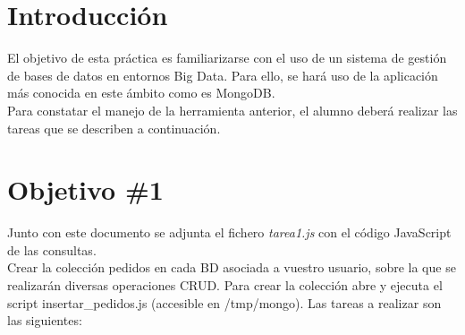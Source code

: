 \usepackage[table,xcdraw]{xcolor}


\newpage         




	
\setcounter{page}{0}



\thispagestyle{empty}

\newpage %

\tableofcontents %


\newpage


\section{Introducción}

El objetivo de esta práctica es familiarizarse con el uso de un sistema de gestión de bases de datos en entornos Big Data. Para ello, se hará uso de la aplicación más conocida en este ámbito como es MongoDB. \\

Para constatar el manejo de la herramienta anterior, el alumno deberá realizar las tareas que se describen a continuación. \\

\section{Objetivo \#1}

Junto con este documento se adjunta el fichero \textit{tarea1.js} con el código JavaScript de las consultas. \\

Crear la colección pedidos en cada BD asociada a vuestro usuario, sobre la que se realizarán diversas operaciones CRUD. Para crear la colección abre y ejecuta el script insertar\_pedidos.js (accesible en /tmp/mongo). Las tareas a realizar son las siguientes: \\


